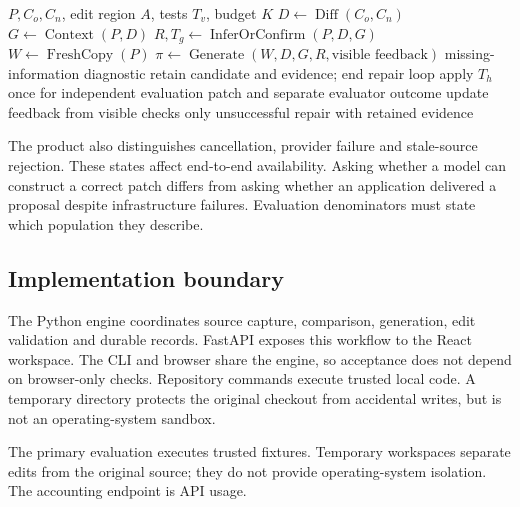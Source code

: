 \begin{algorithm}[t]
\caption{Bounded repair and final-only independent evaluation}\label{alg:repair}
\begin{algorithmic}[1]
\Require $P,C_o,C_n$, edit region $A$, tests $T_v$, budget $K$
\State $D\gets\operatorname{Diff}(C_o,C_n)$
\State $G\gets\operatorname{Context}(P,D)$
\State $R,T_g\gets\operatorname{InferOrConfirm}(P,D,G)$
 \State $W\gets\operatorname{FreshCopy}(P)$
 \State $\pi\gets\operatorname{Generate}(W,D,G,R,\text{visible feedback})$
  \State \Return missing-information diagnostic
 \EndIf
  \State retain candidate and evidence; end repair loop
  \State apply $T_h$ once for independent evaluation
  \State \Return patch and separate evaluator outcome
 \EndIf
 \State update feedback from visible checks only
\EndFor
\State \Return unsuccessful repair with retained evidence
\end{algorithmic}
\end{algorithm}

The product also distinguishes cancellation, provider failure and stale-source rejection. These states affect end-to-end availability. Asking whether a model can construct a correct patch differs from asking whether an application delivered a proposal despite infrastructure failures. Evaluation denominators must state which population they describe.

\subsection{Implementation boundary}
The Python engine coordinates source capture, comparison, generation, edit validation and durable records. FastAPI exposes this workflow to the React workspace. The CLI and browser share the engine, so acceptance does not depend on browser-only checks. Repository commands execute trusted local code. A temporary directory protects the original checkout from accidental writes, but is not an operating-system sandbox.

The primary evaluation executes trusted fixtures. Temporary workspaces separate edits from the original source; they do not provide operating-system isolation. The accounting endpoint is API usage.


